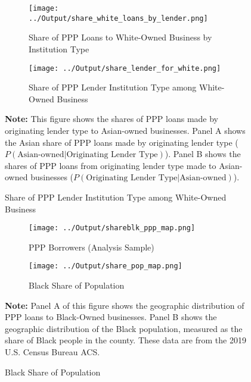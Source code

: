 \documentclass[11pt]{article}
\begin{document}
\newpage
\begin{figure}[H]
	\caption{\textbf{White-Owned Business PPP Lending by Institution Type}} \label{f:white50}
	\centering
	\begin{subfigure}{\linewidth}
		\caption{Share of PPP Loans to White-Owned Business by Institution Type}
		\centering
		\texttt{[image: ../Output/share\_white\_loans\_by\_lender.png]}
		\vspace{0.5cm}
	\end{subfigure}

	\begin{subfigure}{\linewidth}
		\caption{Share of PPP Lender Institution Type among White-Owned Business}
		\centering
		\texttt{[image: ../Output/share\_lender\_for\_white.png]}
	\end{subfigure}

	\begin{minipage}{\textwidth} \medskip
		\footnotesize{{\bf Note: }This figure shows the shares of PPP loans made by originating lender type to Asian-owned businesses. Panel A shows the Asian share of PPP loans made by originating lender type ($P(\text{Asian-owned} | \text{Originating Lender Type})$). Panel B shows the shares of PPP loans from originating lender type made to Asian-owned businesses ($P(\text{Originating Lender Type} | \text{Asian-owned})$).}
	\end{minipage}
\end{figure}

\newpage
\begin{figure}[H]
	\caption{\textbf{Geographic Distribution of PPP Loans to Black-Owned Businesses}}\label{f:geography}
	\centering
	\begin{subfigure}{\linewidth}
		\caption{PPP Borrowers (Analysis Sample)}
		\centering
		\texttt{[image: ../Output/shareblk\_ppp\_map.png]}
	\end{subfigure}

	\begin{subfigure}{\linewidth}
		\caption{Black Share of Population}
		\centering
		\texttt{[image: ../Output/share\_pop\_map.png]}
	\end{subfigure}

	\begin{minipage}{\textwidth} \medskip
		\footnotesize{{\bf Note: }Panel A of this figure shows the geographic distribution of PPP loans to Black-Owned businesses. Panel B shows the geographic distribution of the Black population, measured as the share of Black people in the county. These data are from the 2019 U.S. Census Bureau ACS.}
	\end{minipage}
\end{figure}
\end{document}
